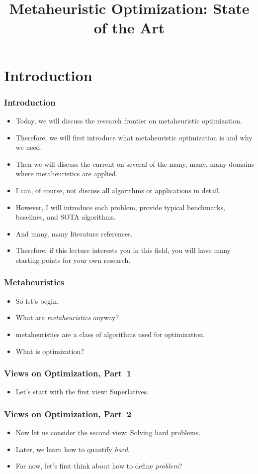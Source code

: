 \documentclass[aspectratio=169,mathserif,notheorems]{beamer}%
\title{Metaheuristic Optimization: State of the Art}%
\begin{document}
%
\startPresentation%
%
\section{Introduction}%
%
\begin{frame}%
\frametitle{Introduction}%
\begin{itemize}%
\item Today, we will discuss the research frontier on \gls{metaheuristic} optimization.%
\item<2-> Therefore, we will first introduce what \gls{metaheuristic} optimization is and why we need.%
\item<3-> Then we will discuss the current  on several of the many, many, many domains where \glspl{metaheuristic} are applied.%
\item<4-> I can, of course, not discuss all algorithms or applications in detail.%
\item<5-> However, I will introduce each problem, provide typical benchmarks, baselines, and \gls{SOTA} algorithms.%
\item<6-> And many, many literature references.%
\item<7-> Therefore, if this lecture interests you in this field, you will have many starting points for your own research.%
\end{itemize}%
\end{frame}%
%
\begin{frame}%
\frametitle{Metaheuristics}%
\begin{itemize}%
\item So let's begin.%
\item<2-> What are \emph{\glspl{metaheuristic}} anyway?%
\item<3-> \Glspl{metaheuristic} are a class of algorithms used for \alert{optimization}.%
\item<4-> What is optimization?%
\end{itemize}%
\end{frame}%
%
%
%
\begin{frame}%
\frametitle{Views on Optimization, Part~1}%
\begin{itemize}%
\item Let's start with the first view: \alert{Superlatives}.%
\end{itemize}%
\end{frame}%
%
%
%
\begin{frame}%
\frametitle{Views on Optimization, Part~2}%
\begin{itemize}%
\item Now let us consider the second view: \alert{Solving hard problems}.%
\item<2-> Later, we learn how to quantify \emph{hard}.%
\item<3-> For now, let's first think about how to define \emph{problem}?%
\end{itemize}%
\end{frame}%
\end{document}

